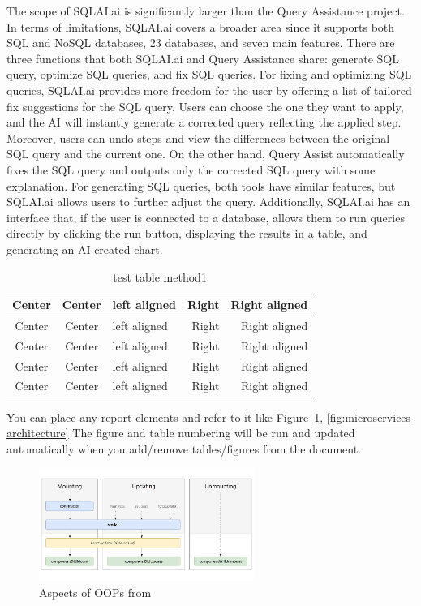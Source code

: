     The scope of SQLAI.ai is significantly larger than the Query Assistance project. In terms of limitations, SQLAI.ai covers a broader area since it supports both SQL and NoSQL databases, 23 databases, and seven main features. There are three functions that both SQLAI.ai and Query Assistance share: generate SQL query, optimize SQL queries, and fix SQL queries. For fixing and optimizing SQL queries, SQLAI.ai provides more freedom for the user by offering a list of tailored fix suggestions for the SQL query. Users can choose the one they want to apply, and the AI will instantly generate a corrected query reflecting the applied step. Moreover, users can undo steps and view the differences between the original SQL query and the current one. On the other hand, Query Assist automatically fixes the SQL query and outputs only the corrected SQL query with some explanation. For generating SQL queries, both tools have similar features, but SQLAI.ai allows users to further adjust the query. Additionally, SQLAI.ai has an interface that, if the user is connected to a database, allows them to run queries directly by clicking the run button, displaying the results in a table, and generating an AI-created chart.

    
    \begin{table}[!h]
    \caption{test table method1}\label{tbl:method1}
        \begin{tabular}{c|c|l|rr} \hline\hline
            Center & Center & left aligned & Right & Right aligned \\ \hline\hline
            Center & Center & left aligned & Right & Right aligned \\ \hline
            Center & Center & left aligned & Right & Right aligned \\ 
            Center & Center & left aligned & Right & Right aligned \\ \hline
            Center & Center & left aligned & Right & Right aligned \\ \hline\hline
        \end{tabular}
    \end{table}

    You can place any report elements and refer to it like Figure~\ref{tbl:method1}, \ref{fig:microservices-architecture}
    The figure and table numbering will be run and updated automatically when you add/remove tables/figures from the document.

    \begin{figure}[H]
        \centering
        \includegraphics[width=7cm]{chapters/2/figures/react-lifecycle.png}
        \caption[Aspects of OOPs]{Aspects of OOPs from~\cite{bworld}}
        \label{fig:oop-concept}
    \end{figure}
    
